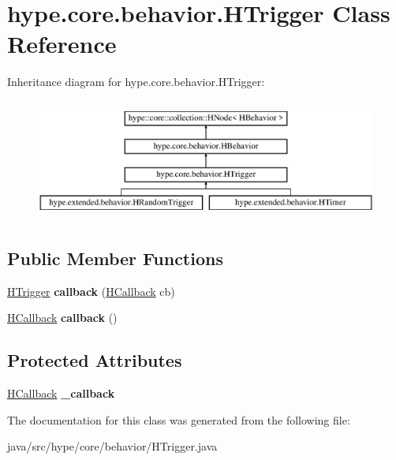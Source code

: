 \hypertarget{classhype_1_1core_1_1behavior_1_1_h_trigger}{\section{hype.\-core.\-behavior.\-H\-Trigger Class Reference}
\label{classhype_1_1core_1_1behavior_1_1_h_trigger}
}
Inheritance diagram for hype.\-core.\-behavior.\-H\-Trigger\-:\begin{figure}[H]
\begin{center}
\leavevmode
\includegraphics[height=4.000000cm]{classhype_1_1core_1_1behavior_1_1_h_trigger}
\end{center}
\end{figure}
\subsection*{Public Member Functions}
\begin{DoxyCompactItemize}
\item 
\hypertarget{classhype_1_1core_1_1behavior_1_1_h_trigger_ac011086834142625b2ed0dc214fbbdf1}{\hyperlink{classhype_1_1core_1_1behavior_1_1_h_trigger}{H\-Trigger} {\bfseries callback} (\hyperlink{interfacehype_1_1core_1_1interfaces_1_1_h_callback}{H\-Callback} cb)}\label{classhype_1_1core_1_1behavior_1_1_h_trigger_ac011086834142625b2ed0dc214fbbdf1}

\item 
\hypertarget{classhype_1_1core_1_1behavior_1_1_h_trigger_acad541d508e83362466da1ed782aa970}{\hyperlink{interfacehype_1_1core_1_1interfaces_1_1_h_callback}{H\-Callback} {\bfseries callback} ()}\label{classhype_1_1core_1_1behavior_1_1_h_trigger_acad541d508e83362466da1ed782aa970}

\end{DoxyCompactItemize}
\subsection*{Protected Attributes}
\begin{DoxyCompactItemize}
\item 
\hypertarget{classhype_1_1core_1_1behavior_1_1_h_trigger_ab3c1145262d74f0a710516e31ac6994a}{\hyperlink{interfacehype_1_1core_1_1interfaces_1_1_h_callback}{H\-Callback} {\bfseries \-\_\-callback}}\label{classhype_1_1core_1_1behavior_1_1_h_trigger_ab3c1145262d74f0a710516e31ac6994a}

\end{DoxyCompactItemize}


The documentation for this class was generated from the following file\-:\begin{DoxyCompactItemize}
\item 
java/src/hype/core/behavior/H\-Trigger.\-java\end{DoxyCompactItemize}
